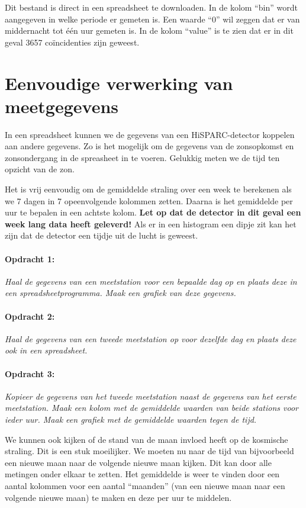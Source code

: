 Dit bestand is direct in een spreadsheet te downloaden. In de kolom
``bin'' wordt aangegeven in welke periode er gemeten is. Een waarde
``0'' wil zeggen dat er van middernacht tot één uur gemeten is.
In de kolom ``value'' is te zien dat er in dit geval 3657 coïncidenties
zijn geweest.


\section{Eenvoudige verwerking van meetgegevens}

In een spreadsheet kunnen we de gegevens van een HiSPARC-detector
koppelen aan andere gegevens. Zo is het mogelijk om de gegevens van
de zonsopkomst en zonsondergang in de spreasheet in te voeren. Gelukkig
meten we de tijd ten opzicht van de zon. 

Het is vrij eenvoudig om de gemiddelde straling over een week te berekenen
als we 7 dagen in 7 opeenvolgende kolommen zetten. Daarna is het gemiddelde
per uur te bepalen in een achtste kolom. \textbf{Let op dat de detector
in dit geval een week lang data heeft geleverd!} Als er in een histogram
een dipje zit kan het zijn dat de detector een tijdje uit de lucht
is geweest.


\paragraph*{Opdracht 1:}

\emph{Haal de gegevens van een meetstation voor een bepaalde dag op
en plaats deze in een spreadsheetprogramma. Maak een grafiek van deze
gegevens.}


\paragraph*{Opdracht 2:}

\emph{Haal de gegevens van een tweede meetstation op voor dezelfde
dag en plaats deze ook in een spreadsheet.}


\paragraph*{Opdracht 3:}

\emph{Kopieer de gegevens van het tweede meetstation naast de gegevens
van het eerste meetstation. Maak een kolom met de gemiddelde waarden
van beide stations voor ieder uur. Maak een grafiek met de gemiddelde
waarden tegen de tijd.}

We kunnen ook kijken of de stand van de maan invloed heeft op de kosmische
straling. Dit is een stuk moeilijker. We moeten nu naar de tijd van
bijvoorbeeld een nieuwe maan naar de volgende nieuwe maan kijken.
Dit kan door alle metingen onder elkaar te zetten. Het gemiddelde
is weer te vinden door een aantal kolommen voor een aantal ``maanden''
(van een nieuwe maan naar een volgende nieuwe maan) te maken en deze
per uur te middelen.


